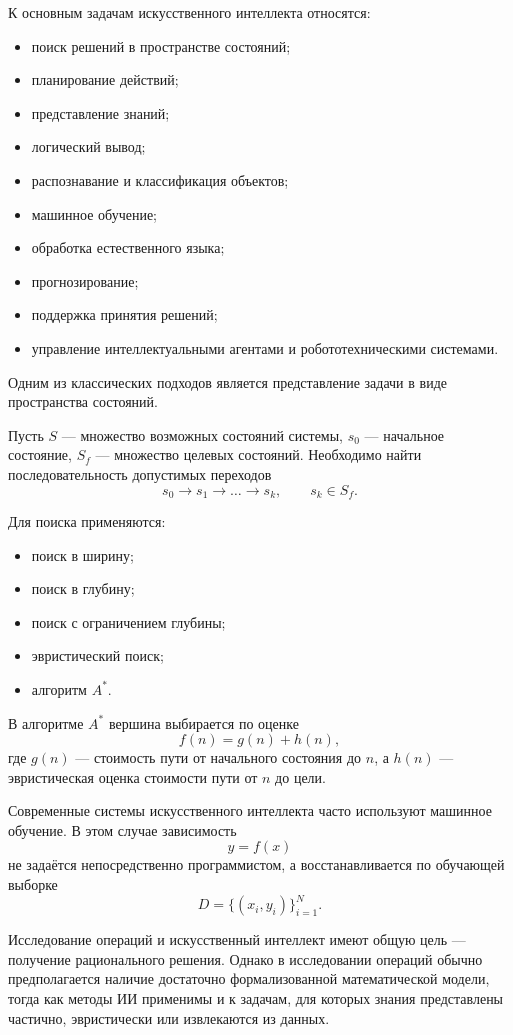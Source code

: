 К основным задачам искусственного интеллекта относятся:
\begin{itemize}
	\item поиск решений в пространстве состояний;
	\item планирование действий;
	\item представление знаний;
	\item логический вывод;
	\item распознавание и классификация объектов;
	\item машинное обучение;
	\item обработка естественного языка;
	\item прогнозирование;
	\item поддержка принятия решений;
	\item управление интеллектуальными агентами и робототехническими системами.
\end{itemize}

Одним из классических подходов является представление задачи в виде пространства состояний.

Пусть $S$ --- множество возможных состояний системы, $s_0$ --- начальное состояние, $S_f$ --- множество целевых состояний. Необходимо найти последовательность допустимых переходов
\[
s_0\rightarrow s_1\rightarrow\ldots\rightarrow s_k,
\qquad
s_k\in S_f.
\]

Для поиска применяются:
\begin{itemize}
	\item поиск в ширину;
	\item поиск в глубину;
	\item поиск с ограничением глубины;
	\item эвристический поиск;
	\item алгоритм $A^*$.
\end{itemize}

В алгоритме $A^*$ вершина выбирается по оценке
\[
f(n)=g(n)+h(n),
\]
где $g(n)$ --- стоимость пути от начального состояния до $n$, а $h(n)$ --- эвристическая оценка стоимости пути от $n$ до цели.

Современные системы искусственного интеллекта часто используют машинное обучение. В этом случае зависимость
\[
y=f(x)
\]
не задаётся непосредственно программистом, а восстанавливается по обучающей выборке
\[
D=\{(x_i,y_i)\}_{i=1}^{N}.
\]

Исследование операций и искусственный интеллект имеют общую цель --- получение рационального решения. Однако в исследовании операций обычно предполагается наличие достаточно формализованной математической модели, тогда как методы ИИ применимы и к задачам, для которых знания представлены частично, эвристически или извлекаются из данных.

